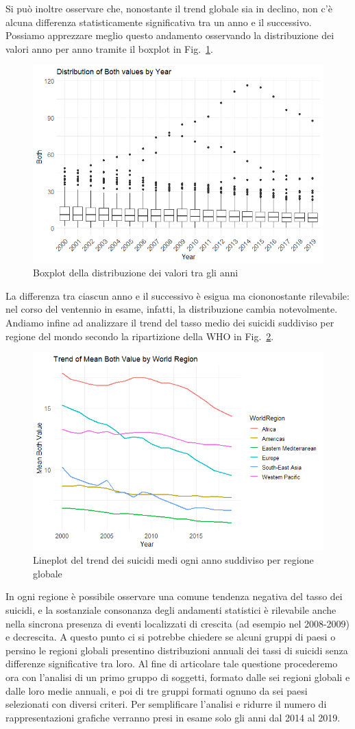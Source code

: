 \documentclass[conference]{IEEEtran}
\begin{document}
Si può inoltre osservare
che, nonostante il trend globale sia in declino, non c'è alcuna differenza
statisticamente significativa tra un anno e il successivo.
Possiamo apprezzare meglio questo andamento 
osservando la distribuzione dei valori anno per anno tramite il boxplot
in Fig.~\ref{3boxyears}.
\begin{figure}[htbp]
    \centerline{\includegraphics[width=.5\textwidth]{img/3 - Boxyears2.png}}
    \caption{Boxplot della distribuzione dei valori tra gli anni}
    \label{3boxyears}
\end{figure}
La differenza tra ciascun anno e il successivo è esigua ma ciononostante rilevabile: nel corso del ventennio
in esame, infatti, la distribuzione cambia notevolmente.
Andiamo infine ad analizzare il trend del tasso medio dei suicidi suddiviso
per regione del mondo secondo la ripartizione della WHO in Fig.~\ref{4wrtrend}.

\begin{figure}[htbp]
    \centerline{\includegraphics[width=.5\textwidth]{img/4 - WRTrend2.png}}
    \caption{Lineplot del trend dei suicidi medi ogni anno suddiviso per regione globale}
    \label{4wrtrend}
\end{figure}

In ogni regione è possibile osservare una comune tendenza negativa
del tasso dei suicidi, e la sostanziale consonanza degli andamenti statistici
è rilevabile anche nella sincrona presenza di eventi localizzati di crescita
(ad esempio nel 2008-2009) e decrescita.
A questo punto ci si potrebbe chiedere se alcuni gruppi
di paesi o persino le regioni globali presentino
distribuzioni annuali dei tassi di suicidi
senza differenze significative tra loro.
Al fine di articolare tale questione procederemo ora con l'analisi di
un primo gruppo di soggetti, formato dalle sei regioni globali e dalle loro medie annuali,
e poi di tre gruppi formati ognuno da sei paesi selezionati con diversi criteri.
Per semplificare l'analisi e ridurre il numero di rappresentazioni grafiche verranno presi in esame solo
gli anni dal 2014 al 2019.
\end{document}
